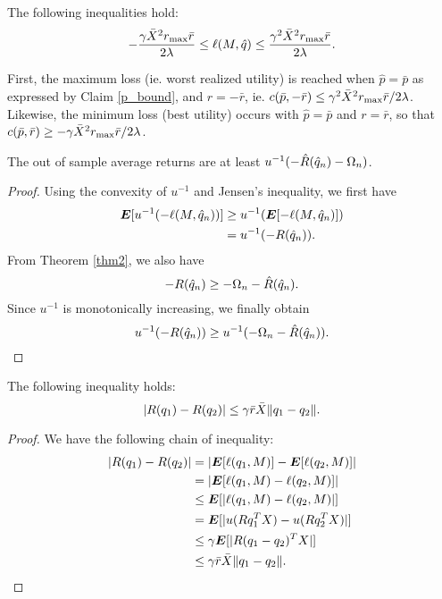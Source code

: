 \begin{claim}
  \label{ell_bound}
  The following inequalities hold:
  \[
    -\frac{\gamma\bar X^2r_{\max}\bar r}{2\lambda} \leq \ell(M,\hat q) \leq \frac{\gamma^2
      \bar X^2 r_{\max} \bar r}{2\lambda}.
  \]
\end{claim}
First, the maximum loss (ie. worst realized utility) is reached when $\hat p=\bar p$ as
expressed by Claim \ref{p_bound}, and $r=-\bar r$, ie.
$c(\bar p,-\bar r) \leq \gamma^2\bar X^2 r_{\max}\bar r/2\lambda$. Likewise, the minimum
loss (best utility) occurs with $\hat p  = \bar p$ and $r = \bar r$, so that $c(\bar p,
\bar r) \geq -\gamma\bar X^2r_{\max}\bar r/2\lambda$. 

\begin{claim}
  \label{out_of_sample_claim}
  The out of sample average returns are at least $u^{-1}(-\hat R({\hat q}_n) - \Omega_n)$.
\end{claim}
\begin{proof}
  Using the convexity of $u^{-1}$ and Jensen's inequality, we first have
  \begin{align*}
    \bm E[u^{-1}(-\ell(M,{\hat q}_n))] &\geq u^{-1}(\bm E[-\ell(M,{\hat q}_n)])\\
                                &=u^{-1}(-R({\hat q}_n)).
  \end{align*}
  From Theorem \ref{thm2}, we also have 
  \[
    -R({\hat q}_n) \geq -\Omega_n - \hat R({\hat q}_n).
  \]
  Since $u^{-1}$ is monotonically increasing, we finally obtain
  \[
    u^{-1}(-R({\hat q}_n)) \geq u^{-1}(-\Omega_n - \hat R({\hat q}_n)).\qedhere
  \]
\end{proof}

\begin{claim}
  The following inequality holds:
  \[
    |R(q_1) - R(q_2)| \leq \gamma\bar r\bar X\|q_1-q_2\|.
  \]
\end{claim}

\begin{proof}
  We have the following chain of inequality:
  \begin{align*}
    |R(q_1) - R(q_2)| &= |\bm E[\ell(q_1,M)] - \bm E[\ell(q_2,M)]|\\
                      &= |\bm E[\ell(q_1,M) - \ell(q_2,M)]|\\
                      &\leq \bm E[|\ell(q_1,M) - \ell(q_2,M)|]\\
                      &= \bm E[|u(Rq_1^TX) - u(Rq_2^TX)|]\\
                      &\leq \gamma \bm E[|R(q_1-q_2)^TX|]\\
                      &\leq \gamma\bar r\bar X\|q_1-q_2\|.\qedhere
  \end{align*}
\end{proof}

